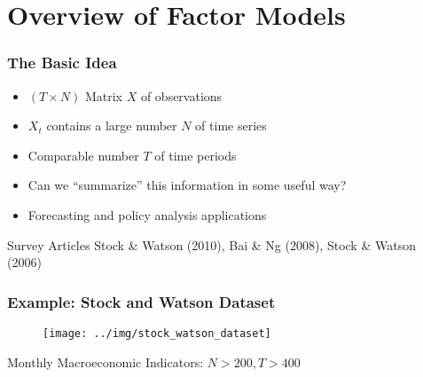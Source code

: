 \section{Overview of Factor Models}
%
%
%
%
%
\begin{frame}
	\frametitle{The Basic Idea}
  \begin{itemize}
    \item $(T\times N)$ Matrix $X$ of observations
    \item $X_t$ contains a large number $N$ of time series
    \item Comparable number $T$ of time periods
    \item Can we ``summarize'' this information in some useful way? 
    \item Forecasting and policy analysis applications
  \end{itemize}

  \begin{block}{Survey Articles}
    \small
    Stock \& Watson (2010), Bai \& Ng (2008), Stock \& Watson (2006)
  \end{block}

\end{frame}
\begin{frame}[c]\frametitle{Example: Stock and Watson Dataset}
    

	\begin{figure}
		\centering
		\texttt{[image: ../img/stock\_watson\_dataset]}
	\end{figure}
Monthly Macroeconomic Indicators: $N > 200, T >400$

\end{frame}

